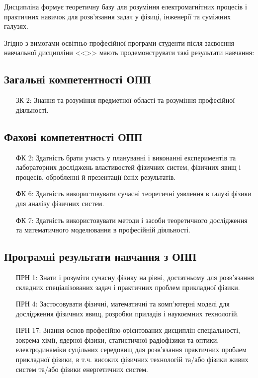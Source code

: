 \documentclass{Syllabus}
\begin{document}
 Дисципліна формує теоретичну базу для розуміння електромагнітних процесів і практичних навичок для розв’язання задач у фізиці, інженерії та суміжних галузях.

Згідно з вимогами освітньо-професійної програми
студенти після засвоєння навчальної дисципліни <<\discipline>> мають продемонструвати такі результати навчання:

\subsection*{Загальні компетентності ОПП}

\begin{enumerate}
	\item [ЗК 2:] Знання та розуміння предметної області та розуміння професійної діяльності.
\end{enumerate}

\subsection*{Фахові компетентності ОПП}

\begin{enumerate}
	\item [ФК 2:] Здатність брати участь у плануванні і виконанні експериментів та лабораторних досліджень властивостей фізичних систем, фізичних явищ і процесів, обробленні й презентації їхніх результатів.
    \item [ФК 6:] Здатність використовувати сучасні теоретичні уявлення в галузі фізики для аналізу фізичних систем.
    \item [ФК 7:] Здатність використовувати методи і засоби теоретичного дослідження та математичного моделювання в професійній діяльності.
\end{enumerate}

\subsection*{Програмні результати навчання з ОПП}

\begin{enumerate}
	\item [ПРН 1:] Знати і розуміти сучасну фізику на рівні, достатньому для розв'язання складних спеціалізованих задач і практичних проблем прикладної фізики.
	\item [ПРН 4:] Застосовувати фізичні, математичні та комп'ютерні моделі для дослідження фізичних явищ, розробки приладів і наукоємних технологій.
	\item [ПРН 17:] Знання основ професійно-орієнтованих дисциплін спеціальності, зокрема  хімії, ядерної фізики, статистичної радіофізики та оптики, електродинаміки суцільних середовищ для розв'язання практичних проблем прикладної фізики, в т.ч. високих фізичних технологій та/або фізики живих систем та/або фізики енергетичних систем.
\end{enumerate}
\end{document}
